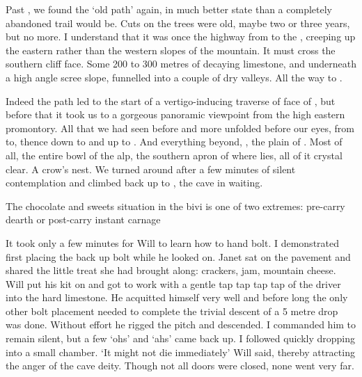 Past , we found the `old  path' again, in much better state than a completely abandoned trail would be. Cuts on the trees were old, maybe two or three years, but no more. I understand that it was once the highway from  to the , creeping up the eastern rather than the western slopes of the mountain. It must cross the  southern cliff face. Some 200 to 300 metres of decaying limestone, and underneath a high angle scree slope, funnelled into a couple of dry valleys. All the way to . 

Indeed the path led to the start of a vertigo-inducing traverse of face of , but before that it took us to a gorgeous panoramic viewpoint from the high eastern promontory. All that we had seen before and more unfolded before our eyes, from  to, thence down to  and up to . And everything beyond, , the plain of . Most of all, the entire bowl of the  alp, the southern apron of  where  lies, all of it crystal clear. A crow's nest. We turned around after a few minutes of silent contemplation and climbed back up to , the cave in waiting. 

\begin{marginfigure}
\centering
{}
\label{chocolate}
\caption{The chocolate and sweets situation in the bivi is one of two extremes: pre-carry dearth or post-carry instant carnage }
\end{marginfigure}

It took only a few minutes for Will to learn how to hand bolt. I demonstrated first placing the back up bolt while he looked on. Janet sat on the pavement and shared the little treat she had brought along: crackers, jam, mountain cheese. Will put his kit on and got to work with a gentle tap tap tap tap  of the driver into the hard limestone. He acquitted himself very well and before long the only other bolt placement needed to complete the trivial descent of a 5 metre drop was done. Without effort he rigged the pitch and descended. I commanded him to remain silent, but a few `ohs' and `ahs' came back up. I followed quickly dropping into a small chamber.
`It might not die immediately' Will said, thereby attracting the anger of the cave deity. Though not all doors were closed, none went very far. 




